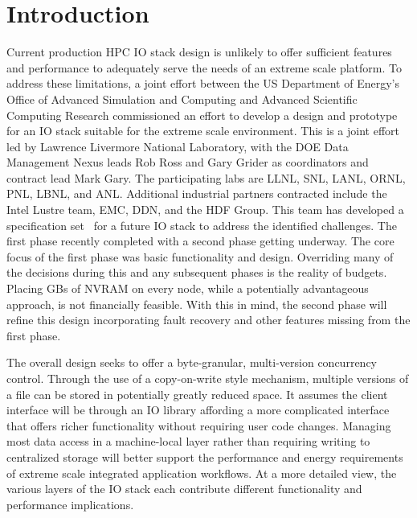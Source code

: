 \documentclass[conference]{IEEEtran}
\begin{document}


\section{Introduction}

Current production HPC IO stack design is unlikely to offer sufficient features
and performance to adequately serve the needs of an extreme scale platform. To
address these limitations, a joint effort between the US Department of Energy's
Office of Advanced Simulation and Computing and Advanced Scientific Computing
Research commissioned an effort to develop a design and prototype for an IO
stack suitable for the extreme scale environment. This is a joint effort led by
Lawrence Livermore National Laboratory, with the DOE Data Management Nexus
leads Rob Ross and Gary Grider as coordinators and contract lead Mark Gary. The
participating labs are LLNL, SNL, LANL, ORNL, PNL, LBNL, and ANL. Additional
industrial partners contracted include the Intel Lustre team, EMC, DDN, and the
HDF Group. This team has developed a specification
set~\cite{fastforward:2014:docs} for a future IO stack to address the
identified challenges. The first phase recently completed with a second phase
getting underway. The core focus of the first phase was basic functionality and
design. Overriding many of the decisions during this and any subsequent phases
is the reality of budgets. Placing GBs of NVRAM on every node, while a
potentially advantageous approach, is not financially feasible. With this in
mind, the second phase will refine this design incorporating fault recovery and
other features missing from the first phase.

The overall design seeks to offer a byte-granular, multi-version concurrency
control. Through the use of a copy-on-write style mechanism, multiple versions
of a file can be stored in potentially greatly reduced space. It assumes the
client interface will be through an IO library affording a more complicated
interface that offers richer functionality without requiring user code changes.
Managing most data access in a machine-local layer rather than requiring
writing to centralized storage will better support the performance and energy
requirements of extreme scale integrated application workflows. At a more
detailed view, the various layers of the IO stack each contribute different
functionality and performance implications.
\end{document}
